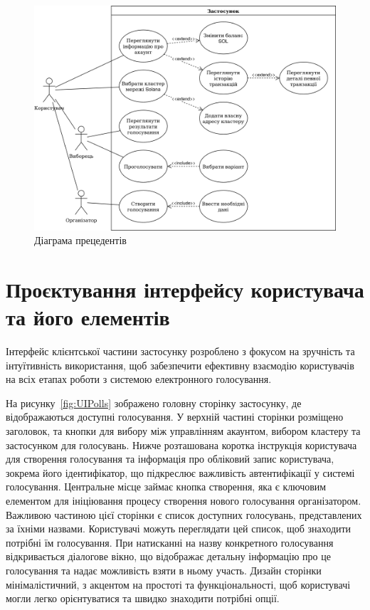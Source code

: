 \documentclass[14pt]{extreport}
\begin{document}
  \begin{figure}[H]
    \centering
    \includegraphics[scale=0.18]{UMLUseCase}
    \caption{Діаграма прецедентів}
    \label{fig:UMLUseCase}
  \end{figure}
  
  \section{Проєктування інтерфейсу користувача та його елементів}
  
  Інтерфейс клієнтської частини застосунку розроблено з фокусом на зручність та інтуїтивність використання, щоб забезпечити ефективну взаємодію користувачів на всіх етапах роботи з системою електронного голосування.

  На рисунку~\ref{fig:UIPolls} зображено головну сторінку застосунку, де відображаються доступні голосування. У верхній частині сторінки розміщено заголовок, та кнопки для вибору між управлінням акаунтом, вибором кластеру та застосунком для голосувань. Нижче розташована коротка інструкція користувача для створення голосування та інформація про обліковий запис користувача, зокрема його ідентифікатор, що підкреслює важливість автентифікації у системі голосування. Центральне місце займає кнопка створення, яка є ключовим елементом для ініціювання процесу створення нового голосування організатором. Важливою частиною цієї сторінки є список доступних голосувань, представлених за їхніми назвами. Користувачі можуть переглядати цей список, щоб знаходити потрібні їм голосування. При натисканні на назву конкретного голосування відкривається діалогове вікно, що відображає детальну інформацію про це голосування та надає можливість взяти в ньому участь. Дизайн сторінки мінімалістичний, з акцентом на простоті та функціональності, щоб користувачі могли легко орієнтуватися та швидко знаходити потрібні опції.
\end{document}
